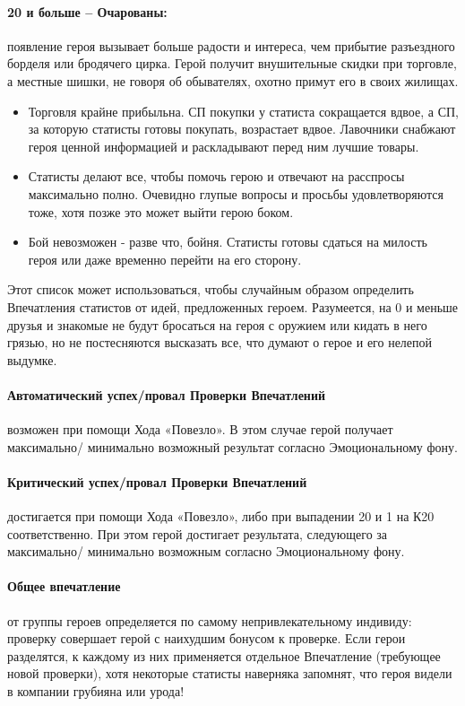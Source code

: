 \paragraph{20 и больше – Очарованы:} появление героя вызывает больше радости и интереса, чем прибытие разъездного борделя или бродячего цирка. Герой получит внушительные скидки при торговле, а местные шишки, не говоря об обывателях, охотно примут его в своих жилищах.
\begin{itemize}
  \item Торговля крайне прибыльна. СП покупки у статиста сокращается вдвое, а СП, за которую статисты готовы покупать, возрастает вдвое. Лавочники снабжают героя ценной информацией и раскладывают перед ним лучшие товары.
  \item Статисты делают все, чтобы помочь герою и отвечают на расспросы максимально полно. Очевидно глупые вопросы и просьбы удовлетворяются тоже, хотя позже это может выйти герою боком.
  \item Бой невозможен - разве что, бойня. Статисты готовы сдаться на милость героя или даже временно перейти на его сторону.
\end{itemize}
\begin{tcolorbox}
  Этот список может использоваться, чтобы случайным образом определить Впечатления статистов от идей, предложенных героем. Разумеется, на 0 и меньше друзья и знакомые не будут бросаться на героя с оружием или кидать в него грязью, но не постесняются высказать все, что думают о герое и его нелепой выдумке.
\end{tcolorbox}

\paragraph{Автоматический успех/провал Проверки Впечатлений} возможен при помощи Хода «Повезло». В этом случае герой получает максимально/ минимально возможный результат согласно Эмоциональному фону.
\paragraph{Критический успех/провал Проверки Впечатлений} достигается при помощи Хода «Повезло», либо при выпадении 20 и 1 на К20 соответственно. При этом герой достигает результата, следующего за максимально/ минимально возможным согласно Эмоциональному фону.

\paragraph{Общее впечатление} от группы героев определяется по самому непривлекательному индивиду: проверку совершает герой с наихудшим бонусом к проверке. Если герои разделятся, к каждому из них применяется отдельное Впечатление (требующее новой проверки), хотя некоторые статисты наверняка запомнят, что героя видели в компании грубияна или урода!

